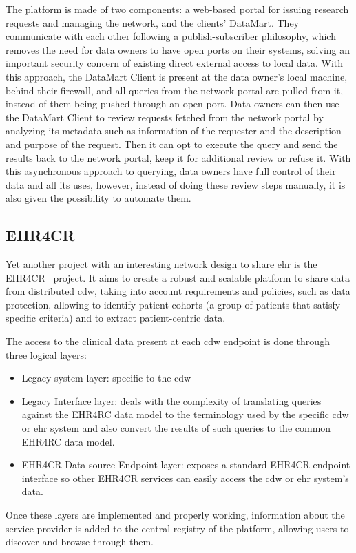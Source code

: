 The platform is made of two components: a web-based portal for issuing research requests and managing the network, and the clients' DataMart.
They communicate with each other following a publish-subscriber philosophy, which removes the need for data owners to have open ports on their systems, solving an important security concern of existing direct external access to local data.
With this approach, the DataMart Client is present at the data owner's local machine, behind their firewall, and all queries from the network portal are pulled from it, instead of them being pushed through an open port.
Data owners can then use the DataMart Client to review requests fetched from the network portal by analyzing its metadata such as information of the requester and the description and purpose of the request.
Then it can opt to execute the query and send the results back to the network portal, keep it for additional review or refuse it.
With this asynchronous approach to querying, data owners have full control of their data and all its uses, however, instead of doing these review steps manually, it is also given the possibility to automate them.

\subsection*{EHR4CR}
Yet another project with an interesting network design to share \gls{ehr} is the EHR4CR~\cite{ehr4cr} project.
It aims to create a robust and scalable platform to share data from distributed \gls{cdw}, taking into account requirements and policies, such as data protection, allowing to identify patient cohorts (a group of patients that satisfy specific criteria) and to extract patient-centric data.

The access to the clinical data present at each \gls{cdw} endpoint is done through three logical layers:
\begin{itemize}
    \item Legacy system layer: specific to the \gls{cdw}
    \item Legacy Interface layer: deals with the complexity of translating queries against the EHR4RC data model to the terminology used by the specific \gls{cdw} or \gls{ehr} system and also convert the results of such queries to the common EHR4RC data model.
    \item EHR4CR Data source Endpoint layer: exposes a standard EHR4CR endpoint interface so other EHR4CR services can easily access the \gls{cdw} or \gls{ehr} system's data.
\end{itemize}
Once these layers are implemented and properly working, information about the service provider is added to the central registry of the platform, allowing users to discover and browse through them.

